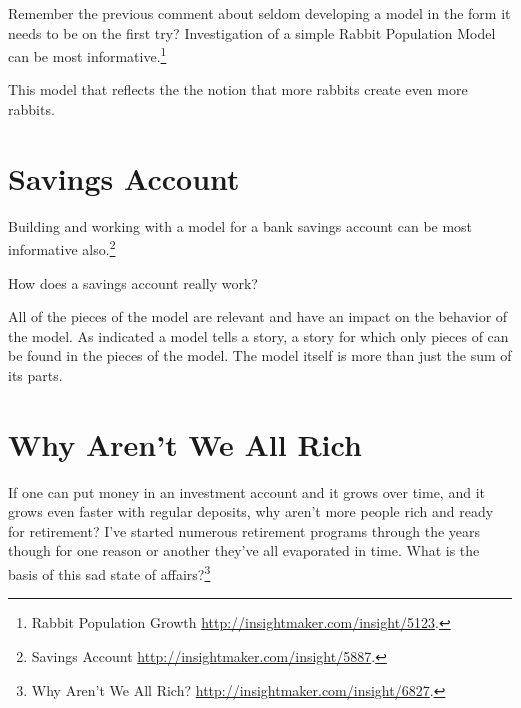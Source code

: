 \documentclass[]{memoir}
\begin{document}
Remember the previous comment about seldom developing a model in the
form it needs to be on the first try? Investigation of a simple Rabbit
Population Model can be most informative.\footnote{Rabbit Population
  Growth \url{http://insightmaker.com/insight/5123}.}

\FloatBarrier 

\begin{model}[frametitle={Model: Rabbit Population Growth}] 

 This model that reflects the the notion that more rabbits create even more rabbits.




 \end{model}

\section{Savings Account}

Building and working with a model for a bank savings account can be most
informative also.\footnote{Savings Account
  \url{http://insightmaker.com/insight/5887}.}

\FloatBarrier 

\begin{model}[frametitle={Model: Savings Account}] 

 How does a savings account really work?




 \end{model}

All of the pieces of the model are relevant and have an impact on the
behavior of the model. As indicated a model tells a story, a story for
which only pieces of can be found in the pieces of the model. The model
itself is more than just the sum of its parts.

\section{Why Aren't We All Rich}

If one can put money in an investment account and it grows over time,
and it grows even faster with regular deposits, why aren't more people
rich and ready for retirement? I've started numerous retirement programs
through the years though for one reason or another they've all
evaporated in time. What is the basis of this sad state of
affairs?\footnote{Why Aren't We All Rich?
  \url{http://insightmaker.com/insight/6827}.}
\end{document}
